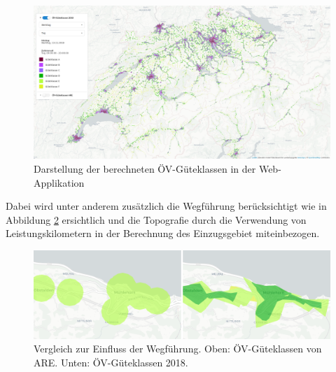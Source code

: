 \begin{figure}[ht]
    \centering
    \includegraphics[width=1\linewidth]{technicalreport/img/resultat_oevgk18_uebersicht}
    \caption[Darstellung der berechneten ÖV-Güteklassen in der Web-Applikation]{Darstellung der berechneten ÖV-Güteklassen in der Web-Applikation}
    \label{fig:mntg_sum_resultat_webapp_uebersicht}
\end{figure}

Dabei wird unter anderem zusätzlich die Wegführung berücksichtigt wie in Abbildung \ref{fig:vergleich_wegfuehrung} ersichtlich und die Topografie durch die Verwendung von Leistungskilometern in der Berechnung des Einzugsgebiet miteinbezogen.

\begin{figure}[ht]
    \centering
    \includegraphics[width=0.8\linewidth]{start/img/vergleich_wegfuehrung}
    \caption[Vergleich zur Einfluss der Wegführung]{Vergleich zur Einfluss der Wegführung. Oben: ÖV-Güteklassen von \ac{ARE}. Unten: ÖV-Güteklassen 2018.}
    \label{fig:vergleich_wegfuehrung}
\end{figure}


